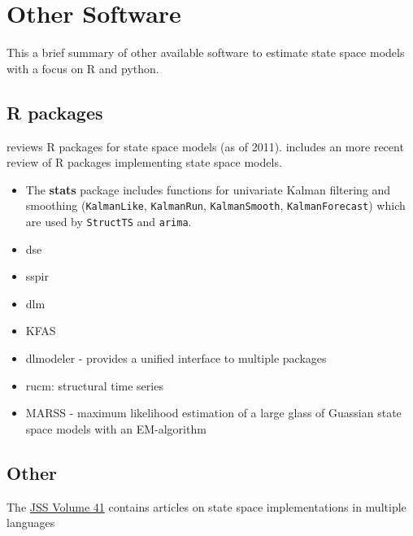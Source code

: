\documentclass[]{book}
\begin{document}
\chapter{Other Software}\label{other-software}

This a brief summary of other available software to estimate state space
models with a focus on R and python.

\section{R packages}\label{r-packages}

\textcite{Tusell2011} reviews R packages for state space models (as of
2011). \textcite{Helske2012} includes an more recent review of R
packages implementing state space models.

\begin{itemize}
\item
  The \textbf{stats} package includes functions for univariate Kalman
  filtering and smoothing (\texttt{KalmanLike}, \texttt{KalmanRun},
  \texttt{KalmanSmooth}, \texttt{KalmanForecast}) which are used by
  \texttt{StructTS} and \texttt{arima}.
\item
  dse
\item
  sspir
\item
  dlm
\item
  KFAS
\item
  dlmodeler - provides a unified interface to multiple packages
\item
  rucm: structural time series
\item
  MARSS - maximum likelihood estimation of a large glass of Guassian
  state space models with an EM-algorithm
\end{itemize}

\section{Other}\label{other}

The \href{https://www.jstatsoft.org/issue/view/v041}{JSS Volume 41}
\autocite{CommandeurKoopmanOoms2011} contains articles on state space
implementations in multiple languages
\end{document}
